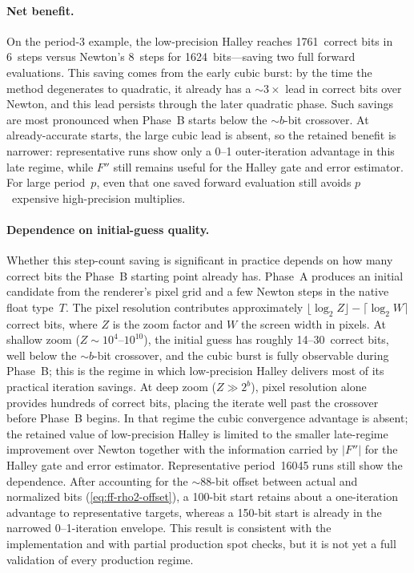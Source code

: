 \paragraph{Net benefit.}
On the period-3 example, the low-precision Halley reaches 1761~correct bits
in 6~steps versus Newton's 8~steps for 1624~bits---saving two full forward
evaluations.  This saving comes from the early cubic burst: by the time the
method degenerates to quadratic, it already has a ${\sim}3\times$ lead in
correct bits over Newton, and this lead persists through the later quadratic
phase.  Such savings are most pronounced when Phase~B starts below the
${\sim}b$-bit crossover.  At already-accurate starts, the large cubic lead is
absent, so the retained benefit is narrower: representative runs show only a
0--1 outer-iteration advantage in this late regime, while $F''$ still remains
useful for the Halley gate and error estimator.  For large period~$p$, even
that one saved forward evaluation still avoids $p$~expensive
high-precision multiplies.

\paragraph{Dependence on initial-guess quality.}
Whether this step-count saving is significant in practice depends on how many
correct bits the Phase~B starting point already has.  Phase~A produces an
initial candidate from the renderer's pixel grid and a few Newton steps in
the native float type~$T$.  The pixel resolution contributes approximately
$\lfloor\log_2 Z\rfloor - \lceil\log_2 W\rceil$ correct bits, where $Z$ is
the zoom factor and $W$ the screen width in pixels.  At shallow zoom
($Z \sim 10^{4}$--$10^{10}$), the initial guess has roughly 14--30~correct
bits, well below the ${\sim}b$-bit crossover, and the cubic burst is fully
observable during Phase~B; this is the regime in which low-precision Halley
delivers most of its practical iteration savings.  At deep zoom ($Z \gg 2^b$),
pixel resolution alone provides hundreds of correct bits, placing the iterate
well past the crossover before Phase~B begins.  In that regime the cubic
convergence advantage is absent; the retained value of low-precision Halley is
limited to the smaller late-regime improvement over Newton together with the
information carried by $|F''|$ for the Halley gate and error estimator.
Representative period~16045 runs still show the dependence.  After accounting
for the ${\sim}88$-bit offset between actual and normalized bits
(\cref{eq:ff-rho2-offset}), a 100-bit start retains about a one-iteration
advantage to representative targets, whereas a 150-bit start is already in the
narrowed 0--1-iteration envelope.  This result is consistent with the implementation
and with partial production spot checks, but it is not yet a full validation of
every production regime.

